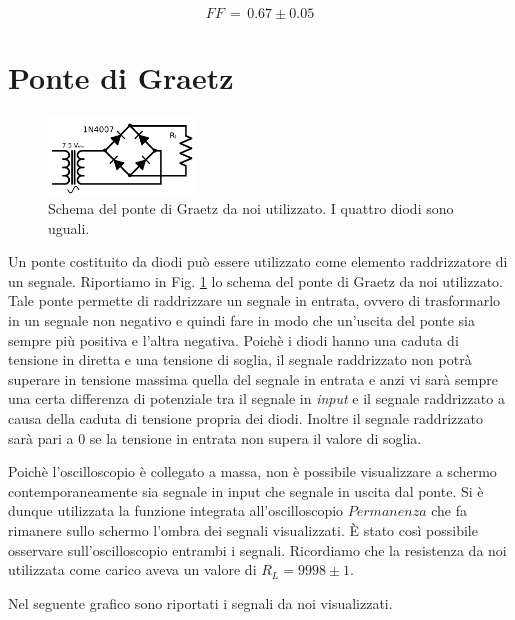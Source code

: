 $$FF \,=\, 0.67 \pm 0.05$$


\section{Ponte di Graetz}

\begin{figure}
	\includegraphics[width=0.35\textwidth]{schema_graetz.pdf}
	\caption{Schema del ponte di Graetz da noi utilizzato. I quattro diodi sono uguali.}
	\label{fig:graetz}
\end{figure}

Un ponte costituito da diodi può essere utilizzato come elemento raddrizzatore di un segnale. Riportiamo in Fig. \ref{fig:graetz} lo schema del ponte di Graetz da noi utilizzato. Tale ponte permette di raddrizzare un segnale in entrata, ovvero di trasformarlo in un segnale non negativo e quindi fare in modo che un'uscita del ponte sia sempre più positiva e l'altra negativa. Poichè i diodi hanno una caduta di tensione in diretta e una tensione di soglia, il segnale raddrizzato non potrà superare in tensione massima quella del segnale in entrata e anzi vi sarà sempre una certa differenza di potenziale tra il segnale in \emph{input} e il segnale raddrizzato a causa della caduta di tensione propria dei diodi.
Inoltre il segnale raddrizzato sarà pari a 0 se la tensione in entrata non supera il valore di soglia.

Poichè l'oscilloscopio è collegato a massa, non è possibile visualizzare a schermo contemporaneamente sia segnale in input che segnale in uscita dal ponte. Si è dunque utilizzata la funzione integrata all'oscilloscopio $Permanenza$ che fa rimanere sullo schermo l'ombra dei segnali visualizzati. \`E stato così possibile osservare sull'oscilloscopio entrambi i segnali. Ricordiamo che la resistenza da noi utilizzata come carico aveva un valore di $R_L=9998 \pm 1$.

Nel seguente grafico sono riportati i segnali da noi visualizzati.

